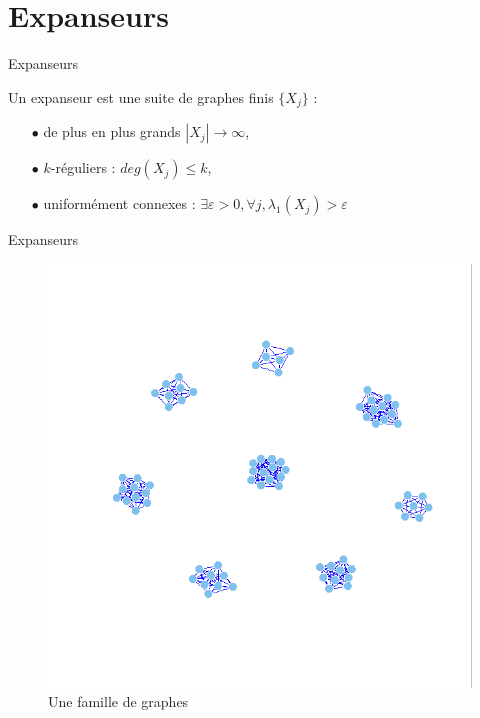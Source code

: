 
\section{Expanseurs}

\begin{frame}{Expanseurs}
\begin{defn}
Un expanseur est une suite de graphes finis $\{X_j\}$ :
\begin{itemize}
\item[$\bullet$] de plus en plus grands $|X_j|\rightarrow \infty$,
\item[$\bullet$] $k$-réguliers : $deg(X_j)\leq k$,
\item[$\bullet$] uniformément connexes : $\exists\varepsilon>0, \forall j, \lambda_1(X_j)>\varepsilon$ 
\end{itemize}
\end{defn}
\end{frame}

\begin{frame}{Expanseurs}
\begin{figure}\includegraphics[scale=0.25]{Graphs5.png}\caption{Une famille de graphes}\end{figure}
\end{frame}

